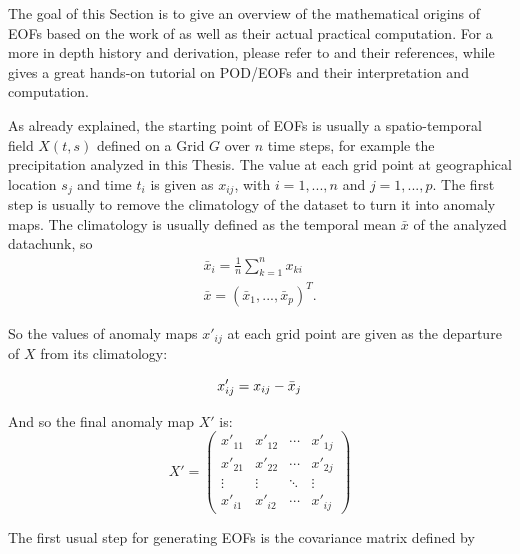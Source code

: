 The goal of this Section is to give an overview of the mathematical origins of EOFs based on the work of  as well as their actual practical computation. 
For a more in depth history and derivation, please refer to \cite{hannachi_empirical_2007} and their references, while  gives a great hands-on tutorial on POD/EOFs and their interpretation and computation. 

As already explained, the starting point of EOFs is usually a spatio-temporal field $X(t, s)$ defined on a Grid $G$ over $n$ time steps, for example the precipitation analyzed in this Thesis. 
The value at each grid point at geographical location $s_j$ and time $t_i$ is given as $x_{ij}$, with $i = 1, ..., n$  and $j = 1, ..., p$.  
The first step is usually to remove the climatology of the dataset to turn it into anomaly maps. 
The climatology is usually defined as the temporal mean $\bar{x}$ of the analyzed datachunk, so 
\begin{align}
  \bar{x}_i = \frac{1}{n} \sum^{n}_{k=1} x_{ki} \\
  \bar{x} = (\bar{x}_1, ..., \bar{x}_p)^T .
  \label{eq:climatology}
\end{align}

So the values of anomaly maps $x'_{ij}$ at each grid point are given as the departure of $X$ from its climatology: 



\begin{equation}
  x'_{ij} = x_{ij} - \bar{x}_j \\
  \label{eq:anomaly map elements}
\end{equation}

And so the final anomaly map $X'$ is: 
\begin{equation}
  X' = \begin{pmatrix}
x'_{11} & x'_{12} & \cdots & x'_{1j} \\
x'_{21} & x'_{22} & \cdots & x'_{2j} \\
\vdots & \vdots & \ddots & \vdots \\
x'_{i1} & x'_{i2} & \cdots & x'_{ij}
\end{pmatrix}
  \label{eq:anomaly map}
\end{equation}

The first usual step for generating EOFs is the covariance matrix defined by 

